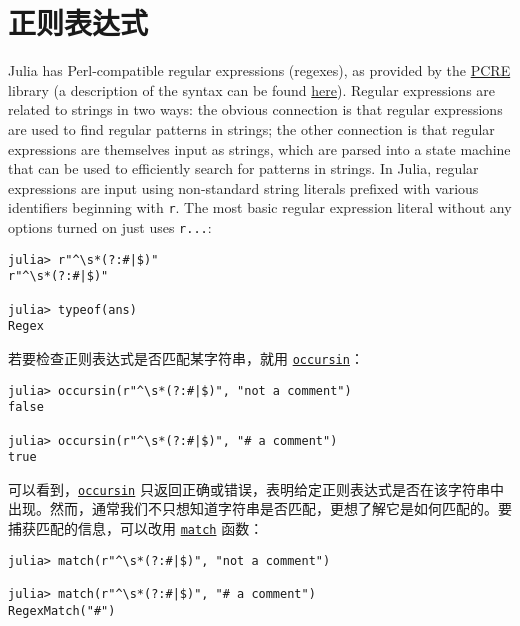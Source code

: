 \hypertarget{2492267677934939291}{}


\section{正则表达式}



Julia has Perl-compatible regular expressions (regexes), as provided by the \href{http://www.pcre.org/}{PCRE} library (a description of the syntax can be found \href{http://www.pcre.org/current/doc/html/pcre2syntax.html}{here}). Regular expressions are related to strings in two ways: the obvious connection is that regular expressions are used to find regular patterns in strings; the other connection is that regular expressions are themselves input as strings, which are parsed into a state machine that can be used to efficiently search for patterns in strings. In Julia, regular expressions are input using non-standard string literals prefixed with various identifiers beginning with \texttt{r}. The most basic regular expression literal without any options turned on just uses \texttt{r{\textquotedbl}...{\textquotedbl}}:




\begin{verbatim}
julia> r"^\s*(?:#|$)"
r"^\s*(?:#|$)"

julia> typeof(ans)
Regex
\end{verbatim}



若要检查正则表达式是否匹配某字符串，就用 \hyperlink{7988132114328914630}{\texttt{occursin}}：




\begin{verbatim}
julia> occursin(r"^\s*(?:#|$)", "not a comment")
false

julia> occursin(r"^\s*(?:#|$)", "# a comment")
true
\end{verbatim}



可以看到，\hyperlink{7988132114328914630}{\texttt{occursin}} 只返回正确或错误，表明给定正则表达式是否在该字符串中出现。然而，通常我们不只想知道字符串是否匹配，更想了解它是如何匹配的。要捕获匹配的信息，可以改用 \hyperlink{2695862412477105800}{\texttt{match}} 函数：




\begin{verbatim}
julia> match(r"^\s*(?:#|$)", "not a comment")

julia> match(r"^\s*(?:#|$)", "# a comment")
RegexMatch("#")
\end{verbatim}



